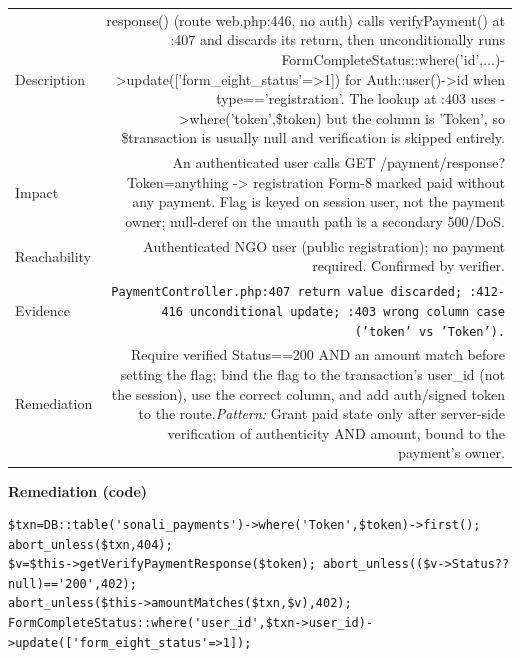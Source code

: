 \documentclass[11pt,a4paper]{article}
\begin{document}
{\renewcommand{\arraystretch}{1.35}%
\begin{tabularx}{\textwidth}{L R}
\toprule
Description & response() (route web.php:446, no auth) calls verifyPayment() at :407 and discards its return, then unconditionally runs FormCompleteStatus::where('id',...)-\textgreater{}update(['form\_eight\_status'=\textgreater{}1]) for Auth::user()-\textgreater{}id when type=='registration'. The lookup at :403 uses -\textgreater{}where('token',\$token) but the column is 'Token', so \$transaction is usually null and verification is skipped entirely. \\
Impact & An authenticated user calls GET /payment/response?Token=anything -\textgreater{} registration Form-8 marked paid without any payment. Flag is keyed on session user, not the payment owner; null-deref on the unauth path is a secondary 500/DoS. \\
Reachability & Authenticated NGO user (public registration); no payment required. Confirmed by verifier. \\
Evidence & \texttt{\small PaymentController.php:407 return value discarded; :412-416 unconditional update; :403 wrong column case ('token' vs 'Token').} \\
Remediation & Require verified Status==200 AND an amount match before setting the flag; bind the flag to the transaction's user\_id (not the session), use the correct column, and add auth/signed token to the route.\newline\emph{Pattern:} Grant paid state only after server-side verification of authenticity AND amount, bound to the payment's owner. \\
\bottomrule
\end{tabularx}}

\vspace{4pt}\noindent\textbf{Remediation (code)}\par
\begin{lstlisting}
$txn=DB::table('sonali_payments')->where('Token',$token)->first(); abort_unless($txn,404);
$v=$this->getVerifyPaymentResponse($token); abort_unless(($v->Status??null)=='200',402);
abort_unless($this->amountMatches($txn,$v),402);
FormCompleteStatus::where('user_id',$txn->user_id)->update(['form_eight_status'=>1]);
\end{lstlisting}
\end{document}
